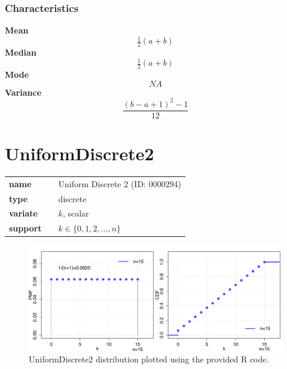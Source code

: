 \subsubsection*{Characteristics}
\smallskip \noindent \hspace{.2cm} \textbf{Mean} 
\begin{equation*}\tfrac{1}{2}(a+b)\end{equation*}
\smallskip \noindent \hspace{.2cm} \textbf{Median} 
\begin{equation*}\tfrac{1}{2}(a+b)\end{equation*}
\smallskip \noindent \hspace{.2cm} \textbf{Mode} 
\begin{equation*}NA\end{equation*}
\smallskip \noindent \hspace{.2cm} \textbf{Variance} 
\begin{equation*}\frac{(b-a+1)^2 -1}{12}\end{equation*}
\smallskip
\section*{UniformDiscrete2} 

  \bigskip 

\begin{tabular}{p{2cm}cl}
\textbf{name} & & Uniform Discrete 2 (ID: 0000294)\\ 
 
\textbf{type} & & discrete \\ 

\textbf{variate} & & $k$, scalar \\ 

\textbf{support} & & $k \in \{0,1,2,\dots,n\}$
\end{tabular}

\begin{figure}[ht!]
\centering
  \includegraphics[width=140mm]{pics/UniformDiscrete2.pdf}
 \caption{UniformDiscrete2 distribution plotted using the provided R code.}
 \label{fig:UniformDiscrete2}
\end{figure}

